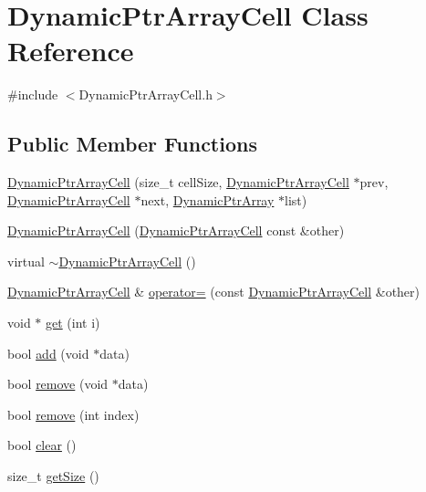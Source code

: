 \hypertarget{class_dynamic_ptr_array_cell}{\section{Dynamic\+Ptr\+Array\+Cell Class Reference}
\label{class_dynamic_ptr_array_cell}
}


{\ttfamily \#include $<$Dynamic\+Ptr\+Array\+Cell.\+h$>$}

\subsection*{Public Member Functions}
\begin{DoxyCompactItemize}
\item 
\hyperlink{class_dynamic_ptr_array_cell_a82723ab1e38b2ac3266182941d833dcb}{Dynamic\+Ptr\+Array\+Cell} (size\+\_\+t cell\+Size, \hyperlink{class_dynamic_ptr_array_cell}{Dynamic\+Ptr\+Array\+Cell} $\ast$prev, \hyperlink{class_dynamic_ptr_array_cell}{Dynamic\+Ptr\+Array\+Cell} $\ast$next, \hyperlink{class_dynamic_ptr_array}{Dynamic\+Ptr\+Array} $\ast$list)
\item 
\hyperlink{class_dynamic_ptr_array_cell_a3bef088cb035b2f04d9f1a3f10e55a6e}{Dynamic\+Ptr\+Array\+Cell} (\hyperlink{class_dynamic_ptr_array_cell}{Dynamic\+Ptr\+Array\+Cell} const \&other)
\item 
virtual \hyperlink{class_dynamic_ptr_array_cell_adfd6766be886a505bd4d7f7c83f8b47f}{$\sim$\+Dynamic\+Ptr\+Array\+Cell} ()
\item 
\hyperlink{class_dynamic_ptr_array_cell}{Dynamic\+Ptr\+Array\+Cell} \& \hyperlink{class_dynamic_ptr_array_cell_a14dae78c9ad366514d55e4230fbdd580}{operator=} (const \hyperlink{class_dynamic_ptr_array_cell}{Dynamic\+Ptr\+Array\+Cell} \&other)
\item 
void $\ast$ \hyperlink{class_dynamic_ptr_array_cell_adfbf9cfdcde141f4b58b82dcf8b22405}{get} (int i)
\item 
bool \hyperlink{class_dynamic_ptr_array_cell_ad3f97be55bed8dfd53c49989069edbc0}{add} (void $\ast$data)
\item 
bool \hyperlink{class_dynamic_ptr_array_cell_ae88cea6d0029ab7228bb013851efdc09}{remove} (void $\ast$data)
\item 
bool \hyperlink{class_dynamic_ptr_array_cell_a58d09ad9193f80d221a9718a190717f1}{remove} (int index)
\item 
bool \hyperlink{class_dynamic_ptr_array_cell_ac1b4fb77f0f8a3570d45a740c14eb0e1}{clear} ()
\item 
size\+\_\+t \hyperlink{class_dynamic_ptr_array_cell_a84621246e6c536a8a9c1508a584aedfe}{get\+Size} ()
\end{DoxyCompactItemize}
